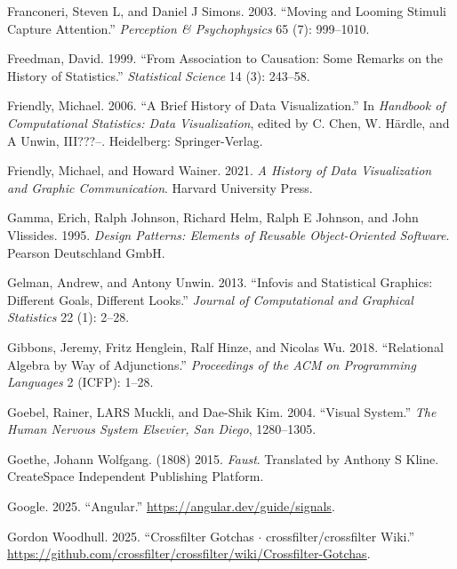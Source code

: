 \documentclass[
  openany]{book}
\newlength{\cslhangindent}
\newenvironment{CSLReferences}[2] %
 {\begin{list}{}{%
  \setlength{\itemindent}{0pt}
  \setlength{\leftmargin}{0pt}
  \setlength{\parsep}{0pt}
  \ifodd #1
   \setlength{\leftmargin}{\cslhangindent}
   \setlength{\itemindent}{-1\cslhangindent}
  \fi
  \setlength{\itemsep}{#2\baselineskip}}}
 {\end{list}}
\theoremstyle{definition}
\theoremstyle{definition}
\theoremstyle{definition}
\theoremstyle{definition}
\theoremstyle{remark}
\begin{document}
\begin{CSLReferences}{1}{0}
Franconeri, Steven L, and Daniel J Simons. 2003. {``Moving and Looming Stimuli Capture Attention.''} \emph{Perception \& Psychophysics} 65 (7): 999--1010.

Freedman, David. 1999. {``From Association to Causation: Some Remarks on the History of Statistics.''} \emph{Statistical Science} 14 (3): 243--58.

Friendly, Michael. 2006. {``A Brief History of Data Visualization.''} In \emph{Handbook of Computational Statistics: Data Visualization}, edited by C. Chen, W. Härdle, and A Unwin, III???--. Heidelberg: Springer-Verlag.

Friendly, Michael, and Howard Wainer. 2021. \emph{A History of Data Visualization and Graphic Communication}. Harvard University Press.

Gamma, Erich, Ralph Johnson, Richard Helm, Ralph E Johnson, and John Vlissides. 1995. \emph{Design Patterns: Elements of Reusable Object-Oriented Software}. Pearson Deutschland GmbH.

Gelman, Andrew, and Antony Unwin. 2013. {``Infovis and Statistical Graphics: Different Goals, Different Looks.''} \emph{Journal of Computational and Graphical Statistics} 22 (1): 2--28.

Gibbons, Jeremy, Fritz Henglein, Ralf Hinze, and Nicolas Wu. 2018. {``Relational Algebra by Way of Adjunctions.''} \emph{Proceedings of the ACM on Programming Languages} 2 (ICFP): 1--28.

Goebel, Rainer, LARS Muckli, and Dae-Shik Kim. 2004. {``Visual System.''} \emph{The Human Nervous System Elsevier, San Diego}, 1280--1305.

Goethe, Johann Wolfgang. (1808) 2015. \emph{Faust}. Translated by Anthony S Kline. CreateSpace Independent Publishing Platform.

Google. 2025. {``Angular.''} \url{https://angular.dev/guide/signals}.

Gordon Woodhull. 2025. {``{Crossfilter Gotchas {\(\cdot\)} crossfilter/crossfilter Wiki}.''} \url{https://github.com/crossfilter/crossfilter/wiki/Crossfilter-Gotchas}.


\end{CSLReferences}
\end{document}
